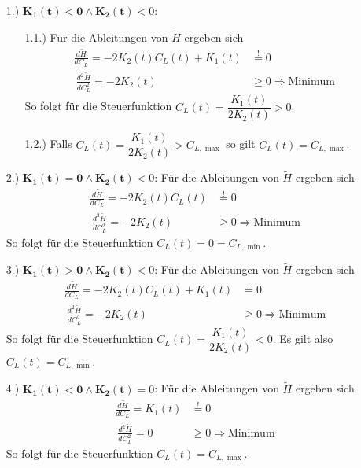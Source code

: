 \begin{enumerate}
\begin{enumerate}
        \item[1.)] $\mathbf{K_1(t) < 0 \wedge K_2(t)} < 0$:
        \begin{enumerate}
            \item[1.1.)] Für die Ableitungen von $\tilde{H}$ ergeben sich
            \[\begin{split}
            \frac{d \tilde{H}}{d C_L} = - 2 K_2(t) C_L(t) + K_1(t) &\stackrel{!}{=} 0 \\\
            \frac{d^2 \tilde{H}}{d C_L^2} = - 2 K_2(t) &\geq 0 \Rightarrow \text{Minimum}
            \end{split}\]
            So folgt für die Steuerfunktion $C_L(t) = \dfrac{K_1(t)}{2 K_2(t)} > 0$.
            \item[1.2.)] Falls $C_L(t) = \dfrac{K_1(t)}{2 K_2(t)} > C_{L, \max}$ so gilt  $C_L(t) = C_{L, \max}$.
        \end{enumerate}
        \item[2.)] $\mathbf{K_1(t) = 0 \wedge K_2(t)} < 0$: Für die Ableitungen von $\tilde{H}$ ergeben sich
        \[\begin{split}
        \frac{d \tilde{H}}{d C_L} = - 2 K_2(t) C_L(t) &\stackrel{!}{=} 0 \\\
        \frac{d^2 \tilde{H}}{d C_L^2} = - 2 K_2(t) &\geq 0 \Rightarrow \text{Minimum}
        \end{split}\]
        So folgt für die Steuerfunktion $C_L(t) = 0 = C_{L, \min}$.
        \item[3.)] $\mathbf{K_1(t) > 0 \wedge K_2(t)} < 0$: Für die Ableitungen von $\tilde{H}$ ergeben sich
        \[\begin{split}
        \frac{d \tilde{H}}{d C_L} = - 2 K_2(t) C_L(t) + K_1(t) &\stackrel{!}{=} 0 \\\
        \frac{d^2 \tilde{H}}{d C_L^2} = - 2 K_2(t) &\geq 0 \Rightarrow \text{Minimum}
        \end{split}\]
        So folgt für die Steuerfunktion $C_L(t) = \dfrac{K_1(t)}{2 K_2(t)} < 0$. Es gilt also $C_L(t) = C_{L, \min}$.
        \item[4.)] $\mathbf{K_1(t) < 0 \wedge K_2(t)} = 0$: Für die Ableitungen von $\tilde{H}$ ergeben sich
        \[\begin{split}
        \frac{d \tilde{H}}{d C_L} = K_1(t) &\stackrel{!}{=} 0 \\\
        \frac{d^2 \tilde{H}}{d C_L^2} = 0 &\geq 0 \Rightarrow \text{Minimum}
        \end{split}\]
        So folgt für die Steuerfunktion $C_L(t) = C_{L, \max}$.

\end{enumerate}
\end{enumerate}
